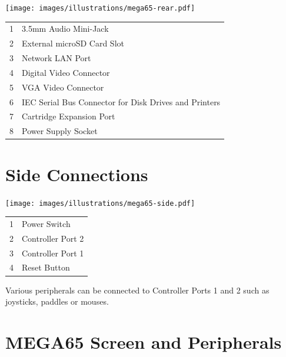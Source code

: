 \texttt{[image: images/illustrations/mega65-rear.pdf]}
\begin{center}
\begin{longtable}{ c | l}
	1	& 	3.5mm Audio Mini-Jack \\
	2	& 	External microSD Card Slot\\
	3	& 	Network LAN Port \\
	4	& 	Digital Video Connector \\
	5	& 	VGA Video Connector \\
	6	& 	IEC Serial Bus Connector for Disk Drives and Printers \\
	7	& 	Cartridge Expansion Port \\
	8	& 	Power Supply Socket \\
\end{longtable}
\end{center}

\vspace{-1cm}

\section{Side Connections}

\texttt{[image: images/illustrations/mega65-side.pdf]}

\begin{center}
\begin{longtable}{ c | l}
	1	& 	Power Switch \\
	2	& 	Controller Port 2 \\
	3	& 	Controller Port 1 \\
	4	& 	Reset Button \\
\end{longtable}
\end{center}
Various peripherals can be connected to Controller Ports 1 and 2 such as
joysticks, paddles or mouses.

\newpage

\section{MEGA65 Screen and Peripherals}

